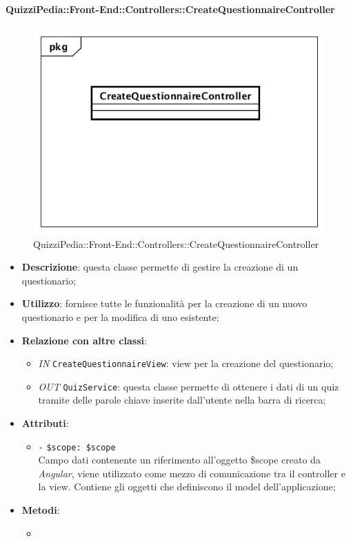 \paragraph{QuizziPedia::Front-End::Controllers::CreateQuestionnaireController}
\begin{figure} [ht]
	\centering
	\includegraphics[scale=0.45]{UML/Classi/Front-End/QuizziPedia_Front-end_Controller_CreateQuestionnaireController.png}
	\caption{QuizziPedia::Front-End::Controllers::CreateQuestionnaireController}
\end{figure} \FloatBarrier
\begin{itemize}
	\item \textbf{Descrizione}: questa classe permette di gestire la creazione di un questionario;
	\item \textbf{Utilizzo}: fornisce tutte le funzionalità per la creazione di un nuovo questionario e per la modifica di uno esistente;
	\item \textbf{Relazione con altre classi}:
	\begin{itemize}
		\item \textit{IN} \texttt{CreateQuestionnaireView}: view per la creazione del questionario; 
		\item \textit{OUT} \texttt{QuizService}: questa classe permette di ottenere i dati di un quiz tramite delle parole chiave inserite dall'utente nella barra di ricerca;
	\end{itemize}
	\item \textbf{Attributi}:
	\begin{itemize}
		\item \texttt{-} \texttt{\$scope: \$scope} \\
		Campo dati contenente un riferimento all’oggetto \$scope creato da \textit{Angular}, viene utilizzato come mezzo di comunicazione tra il controller e la view. Contiene gli oggetti che definiscono il model dell’applicazione;
	\end{itemize}
	\item \textbf{Metodi}:
	\begin{itemize}
		\item 
	\end{itemize}
\end{itemize}

